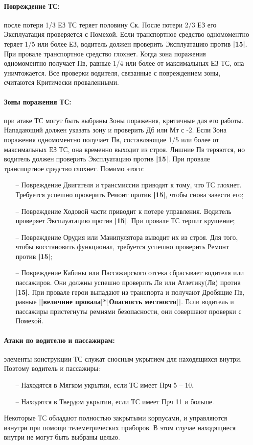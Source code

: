 \paragraph{Повреждение ТС:} после потери 1/3 ЕЗ ТС теряет половину Ск. После потери 2/3 ЕЗ его Эксплуатация проверяется с Помехой.
\newline Если транспортное средство одномоментно теряет 1/5 или более ЕЗ, водитель должен проверить Эксплуатацию против \textbf{|15|}. При провале транспортное средство глохнет.
\newline Когда зона поражения одномоментно получает Пв, равные 1/4 или более от максимальных ЕЗ ТС, она уничтожается. Все проверки водителя, связанные с повреждением зоны, считаются Критически проваленными. 
\paragraph{Зоны поражения ТС:} при атаке ТС могут быть выбраны Зоны поражения, критичные для его работы. Нападающий должен указать зону и проверить Дб или Мт с -2.
\newline Если Зона поражения одномоментно получает Пв, составляющие 1/5 или более от максимальных ЕЗ ТС, она временно выходит из строя. Лишние Пв теряются, но водитель должен проверить Эксплуатацию против \textbf{|15|}. При провале транспортное средство глохнет. Помимо этого:
\begin{itemize}
    \item[--] Повреждение Двигателя и трансмиссии приводят к тому, что ТС глохнет. Требуется успешно проверить Ремонт против \textbf{|15|}, чтобы снова завести его;
    \item[--] Повреждение Ходовой части приводит к потере управления. Водитель проверяет Эксплуатацию против \textbf{|15|}. При провале ТС терпит крушение;
    \item[--] Повреждение Орудия или Манипулятора выводит их из строя. Для того, чтобы восстановить функционал, требуется успешно проверить Ремонт против \textbf{|15|};
    \item[--] Повреждение Кабины или Пассажирского отсека сбрасывает водителя или пассажиров. Они должны успешно проверить Лв или Атлетику(Лв) против \textbf{|15|}. При провале герои выпадают из транспорта и получают Дробящие Пв, равные \textbf{|[величине провала]*[Опасность местности]|}. Если водитель и пассажиры пристегнуты ремнями безопасности, они совершают проверки с Помехой.
\end{itemize}
\paragraph{Атаки по водителю и пассажирам:} элементы конструкции ТС служат сносным укрытием для находящихся внутри. Поэтому водитель и пассажиры:
\begin{itemize}
    \item[--] Находятся в Мягком укрытии, если ТС имеет Прч 5 – 10.
    \item[--] Находятся в Твердом укрытии, если ТС имеет Прч 11 и больше.
\end{itemize}
Некоторые ТС обладают полностью закрытыми корпусами, и управляются изнутри при помощи телеметрических приборов. В этом случае находящиеся внутри не могут быть выбраны целью.
